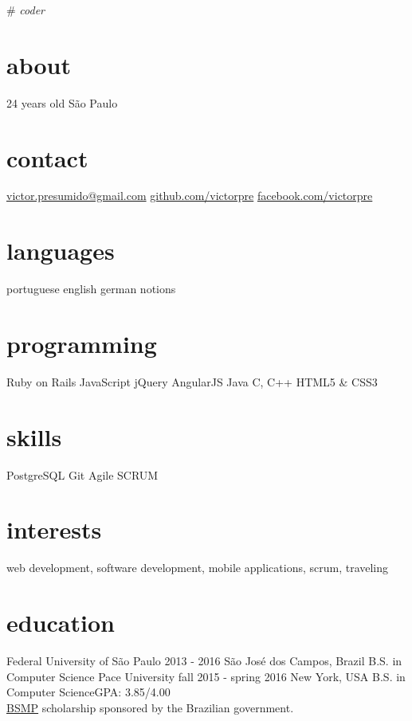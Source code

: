 \documentclass[]{friggeri-cv}
\begin{document}
       {\# \textit{coder}}


\begin{aside}
  \section{about}
	24 years old
	São Paulo
  \section{contact}
    {\footnotesize \href{mailto:victor.presumido@gmail.com}{victor.presumido@gmail.com}}
    \href{https://github.com/victorpre/}{github.com/victorpre}
    \href{http://facebook.com/victorpre}{facebook.com/victorpre}
  \section{languages}
    portuguese
    english
    german notions
  \section{programming}
    Ruby on Rails
    JavaScript
    jQuery
    AngularJS
    Java
	C, C++
	HTML5 \& CSS3
 \section{skills}
	PostgreSQL
	Git
	Agile SCRUM
\end{aside}

\section{interests}

web development, software development, mobile applications, scrum, traveling

\section{education}

\begin{entrylist}
  \entry
    {Federal University of São Paulo}
    {2013 - 2016}
    {São José dos Campos, Brazil}
    {B.S. in Computer Science}
  \entry
    {Pace University}
    {fall 2015 - spring 2016}
    {New York, USA}
    {B.S. in Computer Science\hfill{\small GPA: 3.85/4.00}\\
    \href{http://www.iie.org/programs/brazil-scientific-mobility}{BSMP} scholarship sponsored by the Brazilian government.}
 \end{entrylist}
\end{document}
